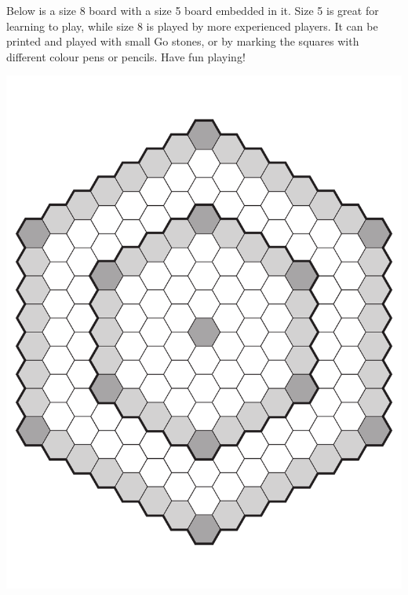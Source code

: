 
Below is a size 8 board with a size 5 board embedded in it. Size 5 is great for learning to play, while size 8 is played by more experienced players. It can be printed and played with small Go stones, or by marking the squares with different colour pens or pencils. Have fun playing!


\newpage

\thispagestyle{empty}

\vspace*{-17mm}
\hspace{-31mm}
\includegraphics[width=200mm,clip=true,trim= 15pt 68pt 15pt 68pt]{boardsize8}


